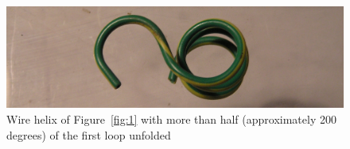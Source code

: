 %

\begin{figure}[!h]
  \centering
  \includegraphics[width=1.1\textwidth]{fig4.jpg}
  \caption{Wire helix of Figure~\ref{fig:1} with more than half (approximately 200 degrees) of the first loop unfolded}
  \label{fig:4}
\end{figure}

%

